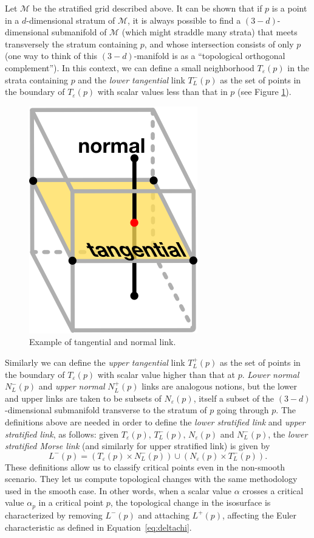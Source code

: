 Let $\mathcal{M}$ be the stratified grid described above.  It can be
shown that if $p$ is a point in a $d$-dimensional stratum of
$\mathcal{M}$, it is always possible to find a $(3-d)$-dimensional
submanifold of $\mathcal{M}$ (which might straddle many strata) that
meets transversely the stratum containing $p$, and whose intersection
consists of only $p$ (one way to think of this $(3-d)$-manifold is as a ``topological orthogonal
complement'').  In this context, we can define a small neighborhood
$T_\varepsilon(p)$ in the strata containing $p$ and the \emph{lower
  tangential} link $T_L^-(p)$ as the set of points in the boundary of
$T_\varepsilon(p)$ with scalar values less than that in $p$ (see Figure \ref{fig:chap4:smt}).
\begin{figure}[b]
\centering
\includegraphics[width=0.3\linewidth]{chapter3/figures/ilustration.png}
\caption{\label{fig:chap4:smt} Example of tangential and normal link.}
\end{figure}
Similarly we can define the \emph{upper tangential} link $T_L^+(p)$ as
the set of points in the boundary of $T_\varepsilon(p)$ with scalar
value higher than that at $p$.  \emph{Lower normal} $N_L^-(p)$ and
\emph{upper normal} $N_L^+(p)$ links are analogous notions, but the
lower and upper links are taken to be subsets of $N_\varepsilon(p)$,
itself a subset of the $(3-d)$-dimensional submanifold transverse to
the stratum of $p$ going through $p$.  The definitions above are needed
in order to define the \emph{lower stratified link} and \emph{upper
  stratified link}, as follows: given $T_\varepsilon(p),\,
T_L^-(p),\,N_\varepsilon(p)$ and $N_L^-(p)$, the \emph{lower
  stratified Morse link} (and similarly for upper stratified link) is
given by
\begin{equation}
L^-(p) = (T_\varepsilon(p) \times N_L^-(p)) \cup (N_\varepsilon(p)
\times T_L^-(p)) \label{eq:lowerstratifiedlink}.
\end{equation}
These definitions allow us to classify critical points even in the non-smooth scenario.
They let us compute topological changes with
the same methodology used in the smooth case. In other words, when a
scalar value $\alpha$ crosses a critical value $\alpha_p$ in a
critical point $p$, the topological change in the isosurface is
characterized by removing $L^-(p)$ and attaching $L^+(p)$, affecting
the Euler characteristic as defined in Equation~\ref{eq:deltachi}.%


